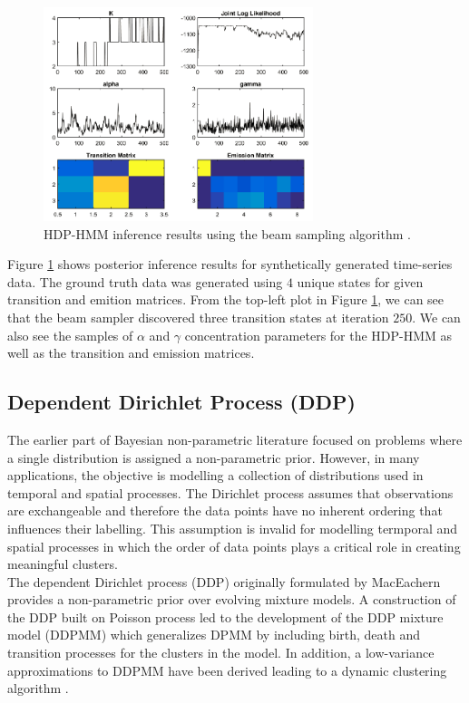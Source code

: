 \begin{figure}[thpb]
    \centering
    \includegraphics[width=0.7\textwidth, trim={10 10 10 10}]{figures/ihmm_beam.png}
    \caption{HDP-HMM inference results using the beam sampling algorithm \cite{VanSaaTeh2008a}.}
    \label{fig:ihmm_beam}
\end{figure}

Figure \ref{fig:ihmm_beam} shows posterior inference results for synthetically generated time-series data. The ground truth data was generated using $4$ unique states for given transition and emition matrices. From the top-left plot in Figure \ref{fig:ihmm_beam}, we can see that the beam sampler discovered three transition states at iteration $250$. We can also see the samples of $\alpha$ and $\gamma$ concentration parameters for the HDP-HMM as well as the transition and emission matrices. 


\subsection{Dependent Dirichlet Process (DDP)}


The earlier part of Bayesian non-parametric literature focused on problems where a single distribution is assigned a non-parametric prior. However, in many applications, the objective is modelling a collection of distributions used in temporal and spatial processes. The Dirichlet process assumes that observations are exchangeable and therefore the data points have no inherent ordering that influences their labelling. This assumption is invalid for modelling termporal and spatial processes in which the order of data points plays a critical role in creating meaningful clusters.\\

The dependent Dirichlet process (DDP) originally formulated by MacEachern \cite{maceachern99a} provides a non-parametric prior over evolving mixture models. A construction of the DDP built on Poisson process \cite{dhlin10nips} led to the development of the DDP mixture model (DDPMM) which generalizes DPMM by including birth, death and transition processes for the clusters in the model. In addition, a low-variance approximations to DDPMM have been derived leading to a dynamic clustering algorithm \cite{Campbell13_NIPS}.\\

